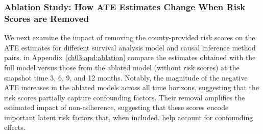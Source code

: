 \subsubsection{Ablation Study: How ATE Estimates Change When Risk Scores are Removed}
\label{ch03:sec:04_results_ablation}

We next examine the impact of removing the county-provided risk scores on the ATE estimates for different survival analysis model and causal inference method pairs. 
 in Appendix~\ref{ch03:apd:ablation} compare the estimates obtained with the full model versus those from the ablated model (without risk scores) at the snapshot time 3, 6, 9, and 12 months. 
Notably, the magnitude of the negative ATE increases in the ablated models across all time horizons, suggesting that the risk scores partially capture confounding factors. 
Their removal amplifies the estimated impact of non-adherence, suggesting that these scores encode important latent risk factors that, when included, help account for confounding effects.

